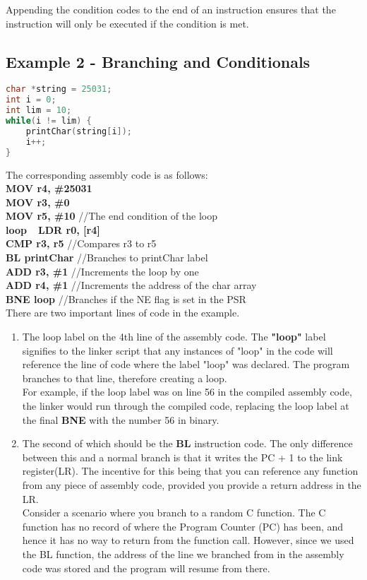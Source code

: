 \documentclass[10pt]{article}
\begin{document}
Appending the condition codes to the end of an instruction ensures that the instruction will only be executed if the condition is met.

\subsection{Example 2 - Branching and Conditionals}
\begin{lstlisting}[language={C}]
char *string = 25031; 
int i = 0; 
int lim = 10;
while(i != lim) { 
	printChar(string[i]); 
	i++; 
}	
\end{lstlisting}
The corresponding assembly code is as follows:\\
\textbf{\indent \indent\indent MOV r4, \#25031} \\
\indent\indent\indent\textbf{MOV r3, \#0} \\
\indent\indent\indent\textbf{MOV r5, \#10} //The end condition of the loop\\
\textbf{loop\ \indent \ LDR r0, [r4]} \\
\indent\indent\indent\textbf{CMP r3, r5} //Compares r3 to r5\\
\indent\indent\indent\textbf{BL printChar} //Branches to printChar label \\
\indent\indent\indent\textbf{ADD r3, \#1} //Increments the loop by one \\
\indent\indent\indent\textbf{ADD r4, \#1} //Increments the address of the char array\\
\indent\indent\indent\textbf{BNE loop} //Branches if the NE flag is set in the PSR\\

There are two important lines of code in the example.
\begin{enumerate}
\item The loop label on the 4th line of the assembly code. The \textbf{"loop"} label signifies to the linker script that any instances of "loop" in the code will reference the line of code where the label "loop" was declared. The program branches to that line, therefore creating a loop.\\

For example, if the loop label was on line 56 in the compiled assembly code, the linker would run through the compiled code, replacing the loop label at the final \textbf{BNE} with the number 56 in binary.
\item The second of which should be the \textbf{BL} instruction code. The only difference between this and a normal branch is that it writes the PC + 1 to the link register(LR). The incentive for this being that you can reference any function from any piece of assembly code, provided you provide a return address in the LR.\\
 
Consider a scenario where you branch to a random C function. The C function has no record of where the Program Counter (PC) has been, and hence it has no way to return from the function call. However, since we used the BL function, the address of the line we branched from in the assembly code was stored and the program will resume from there.\\
\end{enumerate}
\end{document}
